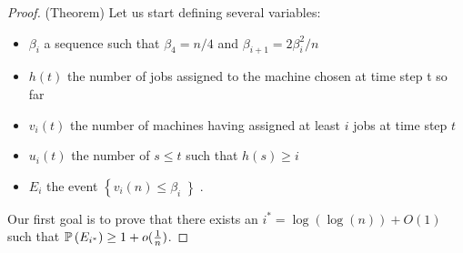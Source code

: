 \begin{proof}(Theorem)
  Let us start defining several variables:
  \begin{itemize}
  \item $\beta_i$ a sequence such that $\beta_4 = n / 4$ and
    $\beta_{i+1} = 2\beta_i^2 / n$
  \item $h(t)$ the number of jobs assigned to the machine chosen
    at time step t so far
  \item $v_i(t)$ the number of machines having assigned at least $i$
    jobs at time step $t$
  \item $u_i(t)$ the number of $s \leq t$ such that $h(s) \geq i$
  \item $E_i$ the event $\left\{v_i(n) \leq \beta_i\left\}$.
  \end{itemize}
  Our first goal is to prove that there exists an $i^*=\log\left(\log(n)\right) + O(1)$ such that $\operatorname{\mathbb{P}}\left(E_{i^*}\right) \geq 1 + o(\frac{1}{n})$.     
  

\end{proof}
